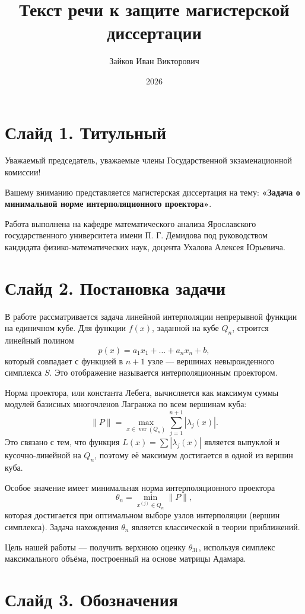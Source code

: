 \documentclass[a4paper,12pt]{article}
\title{Текст речи к защите магистерской диссертации}
\author{Зайков Иван Викторович}
\date{2026}
\begin{document}
\maketitle

\section*{Слайд 1. Титульный}

Уважаемый председатель, уважаемые члены Государственной экзаменационной комиссии!

Вашему вниманию представляется магистерская диссертация на тему: \textbf{«Задача о минимальной норме интерполяционного проектора»}.

Работа выполнена на кафедре математического анализа Ярославского государственного университета имени П. Г. Демидова под руководством кандидата физико-математических наук, доцента Ухалова Алексея Юрьевича.

\section*{Слайд 2. Постановка задачи}

В работе рассматривается задача линейной интерполяции непрерывной функции на единичном кубе. Для функции $f(x)$, заданной на кубе $Q_n$, строится линейный полином
\[
p(x) = a_1 x_1 + \dots + a_n x_n + b,
\]
который совпадает с функцией в $n+1$ узле — вершинах невырожденного симплекса $S$. Это отображение называется интерполяционным проектором.

Норма проектора, или константа Лебега, вычисляется как максимум суммы модулей базисных многочленов Лагранжа по всем вершинам куба:
\[
\|P\| = \max_{x \in \operatorname{ver}(Q_n)} \sum_{j=1}^{n+1} |\lambda_j(x)|.
\]
Это связано с тем, что функция $L(x) = \sum |\lambda_j(x)|$ является выпуклой и кусочно-линейной на $Q_n$, поэтому её максимум достигается в одной из вершин куба.

Особое значение имеет минимальная норма интерполяционного проектора
\[
\theta_n = \min_{x^{(j)} \in Q_n} \|P\|,
\]
которая достигается при оптимальном выборе узлов интерполяции (вершин симплекса). Задача нахождения $\theta_n$ является классической в теории приближений.

Цель нашей работы — получить верхнюю оценку $\theta_{31}$, используя симплекс максимального объёма, построенный на основе матрицы Адамара.

\section*{Слайд 3. Обозначения}
\end{document}
